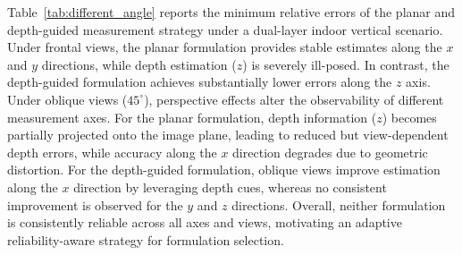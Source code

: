 \documentclass{article}
\begin{document}
Table~\ref{tab:different_angle} reports the minimum relative errors of the planar and depth-guided measurement strategy under a dual-layer indoor vertical scenario. Under frontal views, the planar formulation provides stable estimates along the $x$ and $y$ directions, while depth estimation ($z$) is severely ill-posed. In contrast, the depth-guided formulation achieves substantially lower errors along the $z$ axis. Under oblique views ($45^\circ$), perspective effects alter the observability of different measurement axes. For the planar formulation, depth information ($z$) becomes partially projected onto the image plane, leading to reduced but view-dependent depth errors, while accuracy along the $x$ direction degrades due to geometric distortion. For the depth-guided formulation, oblique views improve estimation along the $x$ direction by leveraging depth cues, whereas no consistent improvement is observed for the $y$ and $z$ directions. Overall, neither formulation is consistently reliable across all axes and views, motivating an adaptive reliability-aware strategy for formulation selection.
\end{document}
